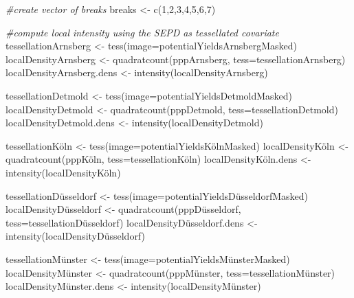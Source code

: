 \documentclass[
]{article}
\newenvironment{Shaded}{\begin{snugshade}}{\end{snugshade}}
\newcommand{\AttributeTok}[1]{\textcolor[rgb]{0.77,0.63,0.00}{#1}}
\newcommand{\CommentTok}[1]{\textcolor[rgb]{0.56,0.35,0.01}{\textit{#1}}}
\newcommand{\DecValTok}[1]{\textcolor[rgb]{0.00,0.00,0.81}{#1}}
\newcommand{\FunctionTok}[1]{\textcolor[rgb]{0.00,0.00,0.00}{#1}}
\newcommand{\NormalTok}[1]{#1}
\newcommand{\OtherTok}[1]{\textcolor[rgb]{0.56,0.35,0.01}{#1}}
\begin{document}
\begin{Shaded}
\begin{Highlighting}[]
\CommentTok{\#create vector of breaks}
\NormalTok{breaks }\OtherTok{\textless{}{-}} \FunctionTok{c}\NormalTok{(}\DecValTok{1}\NormalTok{,}\DecValTok{2}\NormalTok{,}\DecValTok{3}\NormalTok{,}\DecValTok{4}\NormalTok{,}\DecValTok{5}\NormalTok{,}\DecValTok{6}\NormalTok{,}\DecValTok{7}\NormalTok{)}

\CommentTok{\#compute local intensity using the  SEPD as tessellated covariate}
\NormalTok{tessellationArnsberg }\OtherTok{\textless{}{-}} \FunctionTok{tess}\NormalTok{(}\AttributeTok{image=}\NormalTok{potentialYieldsArnsbergMasked)  }
\NormalTok{localDensityArnsberg }\OtherTok{\textless{}{-}} \FunctionTok{quadratcount}\NormalTok{(pppArnsberg, }\AttributeTok{tess=}\NormalTok{tessellationArnsberg)}
\NormalTok{localDensityArnsberg.dens }\OtherTok{\textless{}{-}} \FunctionTok{intensity}\NormalTok{(localDensityArnsberg) }

\NormalTok{tessellationDetmold }\OtherTok{\textless{}{-}} \FunctionTok{tess}\NormalTok{(}\AttributeTok{image=}\NormalTok{potentialYieldsDetmoldMasked)  }
\NormalTok{localDensityDetmold }\OtherTok{\textless{}{-}} \FunctionTok{quadratcount}\NormalTok{(pppDetmold, }\AttributeTok{tess=}\NormalTok{tessellationDetmold)  }
\NormalTok{localDensityDetmold.dens }\OtherTok{\textless{}{-}} \FunctionTok{intensity}\NormalTok{(localDensityDetmold) }

\NormalTok{tessellationKöln }\OtherTok{\textless{}{-}} \FunctionTok{tess}\NormalTok{(}\AttributeTok{image=}\NormalTok{potentialYieldsKölnMasked)  }
\NormalTok{localDensityKöln }\OtherTok{\textless{}{-}} \FunctionTok{quadratcount}\NormalTok{(pppKöln, }\AttributeTok{tess=}\NormalTok{tessellationKöln) }
\NormalTok{localDensityKöln.dens }\OtherTok{\textless{}{-}} \FunctionTok{intensity}\NormalTok{(localDensityKöln) }

\NormalTok{tessellationDüsseldorf }\OtherTok{\textless{}{-}} \FunctionTok{tess}\NormalTok{(}\AttributeTok{image=}\NormalTok{potentialYieldsDüsseldorfMasked)  }
\NormalTok{localDensityDüsseldorf }\OtherTok{\textless{}{-}} \FunctionTok{quadratcount}\NormalTok{(pppDüsseldorf, }\AttributeTok{tess=}\NormalTok{tessellationDüsseldorf)  }
\NormalTok{localDensityDüsseldorf.dens }\OtherTok{\textless{}{-}} \FunctionTok{intensity}\NormalTok{(localDensityDüsseldorf) }

\NormalTok{tessellationMünster }\OtherTok{\textless{}{-}} \FunctionTok{tess}\NormalTok{(}\AttributeTok{image=}\NormalTok{potentialYieldsMünsterMasked)  }
\NormalTok{localDensityMünster }\OtherTok{\textless{}{-}} \FunctionTok{quadratcount}\NormalTok{(pppMünster, }\AttributeTok{tess=}\NormalTok{tessellationMünster)  }
\NormalTok{localDensityMünster.dens }\OtherTok{\textless{}{-}} \FunctionTok{intensity}\NormalTok{(localDensityMünster) }


\end{Highlighting}
\end{Shaded}
\end{document}
